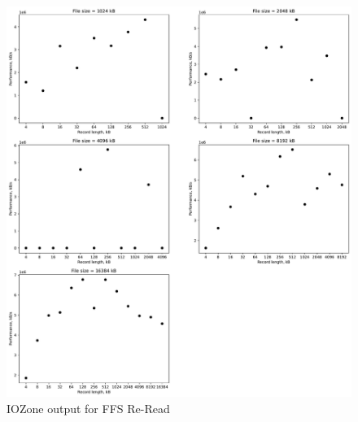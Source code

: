 \begin{figure}[!htb]
	\label{fig:app_bench_ffs_re_read}
	\begin{center}
		\includegraphics[width=1.0\textwidth]{figures/benchmarking/ffs/Re-Read.pdf}
	\end{center}
	\caption{IOZone output for FFS \mbox{Re-Read}}
\end{figure}

